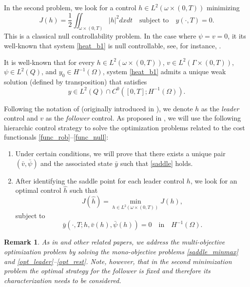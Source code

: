 \documentclass[preprint,10pt]{article}
\newtheorem{remark}[theorem]{Remark}
\numberwithin{equation}{section}
\numberwithin{theorem}{section}
\begin{document}
{In the second problem, we look for a control $h\in L^2(\omega\times(0,T))$ minimizing 
%
\begin{equation}\label{func_null}
J(h)=\frac{1}{2}\iint_{\omega\times(0,T)}|h|^2dxdt \quad\text{subject to}\quad y(\cdot,T)=0. 
\end{equation}
%
This is a classical null controllability problem. In the case where $\psi=v=0$, it its well-known that system \eqref{heat_b1} is null controllable, see, for instance, \cite{fursi,cara_guerrero}. 

It is well-known that for every $h\in L^2(\omega\times(0,T))$, $v\in L^2(\Gamma\times(0,T))$, $\psi\in L^2(Q)$, and $y_0\in H^{-1}(\Omega)$, system \eqref{heat_b1} admits a unique weak solution (defined by transposition) that satisfies
%
\begin{equation}
y\in L^2(Q)\cap C^0([0,T];H^{-1}(\Omega)).
\end{equation} 

Following the notation of \cite{LionsSta} (originally introduced in \cite{Stackelber}), we denote $h$ as the \textit{leader} control and $v$ as the \textit{follower} control. As proposed in \cite{vhs_deT_rob}, we will use the following hierarchic control strategy to solve the optimization problems related to the cost functionals \eqref{func_rob}--\eqref{func_null}: 
%
\begin{enumerate}
\item 
%
Under certain conditions, we will prove that there exists a unique pair $(\bar v,\bar \psi)$ and the associated state $\bar y$ such that \eqref{saddle} holds.
%
\item After identifying the saddle point for each leader control $h$, we look for an optimal control $\hat h$ such that 
%
\begin{equation}\label{opt_leader}
J(\hat h)=\min_{h\in L^2(\omega\times(0,T))}J(h), 
\end{equation}
%
subject to 
%
\begin{equation}\label{opt_rest}
\bar y(\cdot,T;h,\bar v(h),\bar \psi(h))=0 \quad \text{in}\quad  H^{-1}(\Omega).
\end{equation}
%
\end{enumerate}

\begin{remark}
As in \cite{LionsSta} and other related papers, we address the multi-objective optimization problem by solving the mono-objective problems \eqref{saddle_minmax} and \eqref{opt_leader}--\eqref{opt_rest}. Note, however, that in the second minimization problem the optimal strategy for the follower is fixed and therefore its characterization needs to be considered.
\end{remark}

}
\end{document}

